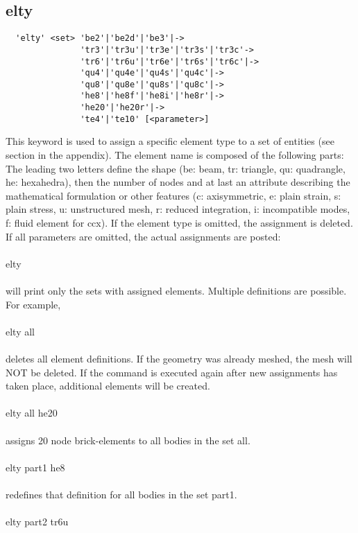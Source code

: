\documentclass{article}
\begin{document}
\subsection{\label{elty}elty}
\begin{verbatim}
  'elty' <set> 'be2'|'be2d'|'be3'|->
               'tr3'|'tr3u'|'tr3e'|'tr3s'|'tr3c'->
               'tr6'|'tr6u'|'tr6e'|'tr6s'|'tr6c'|->
               'qu4'|'qu4e'|'qu4s'|'qu4c'|->
               'qu8'|'qu8e'|'qu8s'|'qu8c'|->
               'he8'|'he8f'|'he8i'|'he8r'|->
               'he20'|'he20r'|->
               'te4'|'te10' [<parameter>]
\end{verbatim}
This keyword is used to assign a specific element type to a set of entities (see section  in the appendix). The element name is composed of the following parts: The leading two letters define the shape (be: beam, tr: triangle, qu: quadrangle, he: hexahedra), then the number of nodes and at last an attribute describing the mathematical formulation or other features (c: axisymmetric, e: plain strain, s: plain stress, u: unstructured mesh, r: reduced integration, i: incompatible modes, f: fluid element for ccx). If the element type is omitted, the assignment is deleted. If all parameters are omitted, the actual assignments are posted:\\\\
elty\\\\
will print only the sets with assigned elements. Multiple definitions are possible. For example,\\\\
elty all\\\\
deletes all element definitions. If the geometry was already meshed, the mesh will NOT be deleted. If the  command is executed again after new assignments has taken place, additional elements will be created.\\\\
elty all he20\\\\
assigns 20 node brick-elements to all bodies in the set all.\\\\
elty part1 he8\\\\
redefines that definition for all bodies in the set part1.\\\\
elty part2 tr6u\\\\
\end{document}
